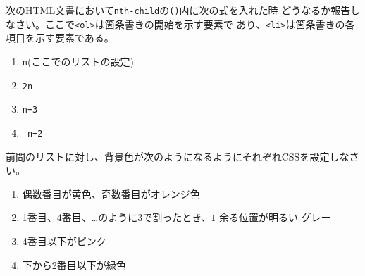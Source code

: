 \begin{Prob}\upshape\label{nth-child}
次のHTML文書において\texttt{nth-child}の\texttt{()}内に次の式を入れた時
 どうなるか報告しなさい。ここで\texttt{<ol>}は箇条書きの開始を示す要素で
 あり、\texttt{<li>}は箇条書きの各項目を示す要素である。
\begin{enumerate}
 \item \texttt{n}(ここでのリストの設定)
 \item \texttt{2n}
 \item \texttt{n+3}
 \item \texttt{-n+2}
\end{enumerate}
\end{Prob}
\begin{Prob}\upshape
前問のリストに対し、背景色が次のようになるようにそれぞれCSSを設定しなさい。
\begin{enumerate}
 \item 偶数番目が黄色、奇数番目がオレンジ色
 \item 1番目、4番目、\dots のように$3$で割ったとき、$1$ 余る位置が明るい
       グレー
 \item 4番目以下がピンク
 \item 下から2番目以下が緑色
\end{enumerate}
\end{Prob}